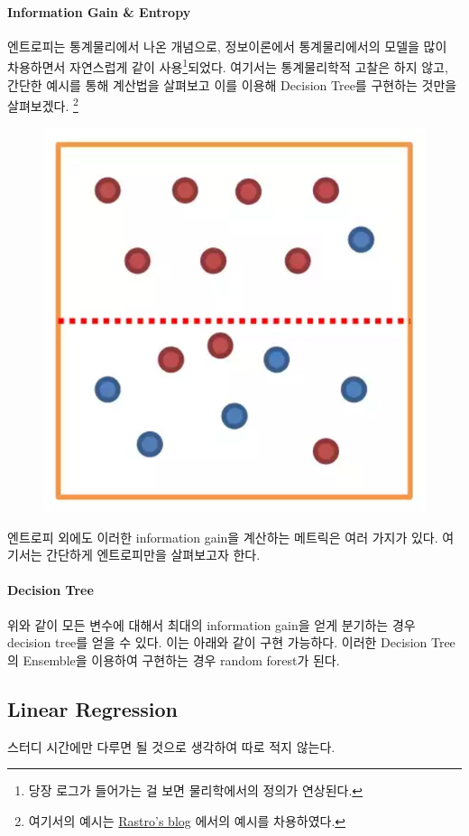 \paragraph{Information Gain \& Entropy} 

엔트로피는 통계물리에서 나온 개념으로, 정보이론에서 통계물리에서의 모델을 많이 차용하면서 자연스럽게 같이 사용\footnote{당장 로그가 들어가는 걸 보면 물리학에서의 정의가 연상된다.}되었다. 여기서는 통계물리학적 고찰은 하지 않고, 간단한 예시를 통해 계산법을 살펴보고 이를 이용해 Decision Tree를 구현하는 것만을 살펴보겠다. \footnote{여기서의 예시는 \href{https://ratsgo.github.io/machine\%20learning/2017/03/26/tree/}{Rastro's blog} 에서의 예시를 차용하였다. } 
\begin{figure}
\centering
\includegraphics{entropy}
\end{figure}

엔트로피 외에도 이러한 information gain을 계산하는 메트릭은 여러 가지가 있다. 여기서는 간단하게 엔트로피만을 살펴보고자 한다. 

\paragraph{Decision Tree} 

위와 같이 모든 변수에 대해서 최대의 information gain을 얻게 분기하는 경우 decision tree를 얻을 수 있다. 이는 아래와 같이 구현 가능하다. 이러한 Decision Tree의 Ensemble을 이용하여 구현하는 경우 random forest가 된다.  


\subsection{Linear Regression} 

스터디 시간에만 다루면 될 것으로 생각하여 따로 적지 않는다. 

